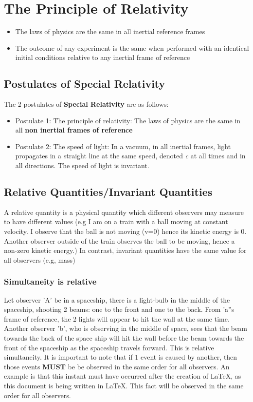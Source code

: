 \documentclass[10pt]{report}
\begin{document}
\section{The Principle of Relativity}
\begin{itemize}
	\item{The laws of physics are the same in all inertial reference frames}
	\item{The outcome of any experiment is the same when performed with an identical initial conditions relative to any inertial frame of reference}
\end{itemize}
\subsection{Postulates of \textbf{Special Relativity}}
\par{The 2 postulates of \textbf{Special Relativity} are as follows:
\begin{itemize}
	\item{Postulate 1: The principle of relativity: The laws of physics are the same in all \textbf{non inertial frames of reference}}
	\item{Postulate 2: The speed of light: In a vacuum, in all inertial frames, light propagates in a straight line at the same speed, denoted \textit{c} at all times and in all directions. The speed of light is invariant.}
\end{itemize}
\subsection{Relative Quantities/Invariant Quantities}
\par{A relative quantity is a physical quantity which different observers may measure to have different values (e.g I am on a train with a ball moving at constant velocity. I observe that the ball is not moving (v=0) hence its kinetic energy is 0. Another observer outside of the train observes the ball to be moving, hence a non-zero kinetic energy.) In contrast, invariant quantities have the same value for all observers (e.g, mass)}
\subsubsection{Simultaneity is relative}
\par{Let observer 'A' be in a spaceship, there is a light-bulb in the middle of the spaceship, shooting 2 beams: one to the front and one to the back. From 'a''s frame of reference, the 2 lights will appear to hit the wall at the same time. Another observer 'b', who is observing in the middle of space, sees that the beam towards the back of the space ship will hit the wall before the beam towards the front of the spaceship as the spaceship travels forward. This is relative simultaneity. It is important to note that if 1 event is caused by another, then those events \textbf{MUST} be be observed in the same order for all observers. An example is that this instant must have occurred after the creation of \LaTeX, as this document is being written in \LaTeX. This fact will be observed in the same order for all observers.}
}
\end{document}
